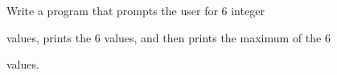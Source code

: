 Write a program that prompts the user for 6 integer

values, prints the 6 values, and then prints the maximum of the 6

values.

